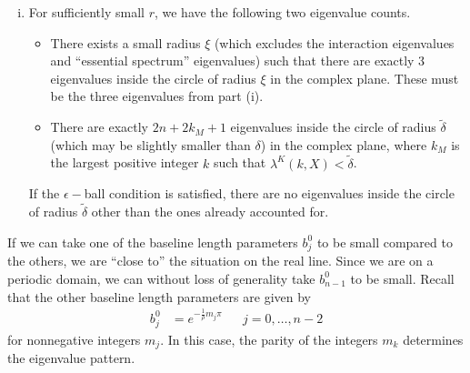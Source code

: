 \documentclass[thesis.tex]{subfiles}
\begin{document}
\begin{theorem}
\begin{enumerate}[(i)]
\item For sufficiently small $r$, we have the following two eigenvalue counts.
\begin{itemize}
	\item There exists a small radius $\xi$ (which excludes the interaction eigenvalues and ``essential spectrum'' eigenvalues) such that there are exactly 3 eigenvalues inside the circle of radius $\xi$ in the complex plane. These must be the three eigenvalues from part (i).

	\item There are exactly $2n + 2 k_M + 1$ eigenvalues inside the circle of radius $\tilde{\delta}$ (which may be slightly smaller than $\delta$) in the complex plane, where $k_M$ is the largest positive integer $k$ such that $\lambda^K(k,X) < \tilde{\delta}$. 
\end{itemize}
If the $\epsilon-$ball condition is satisfied, there are no eigenvalues inside the circle of radius $\tilde{\delta}$ other than the ones already accounted for.
\end{enumerate}
\end{theorem}

If we can take one of the baseline length parameters $b_j^0$ to be small compared to the others, we are ``close to'' the situation on the real line. Since we are on a periodic domain, we can without loss of generality take $b_{n-1}^0$ to be small. Recall that the other baseline length parameters are given by
\begin{align*}
b_j^0 &= e^{-\frac{1}{\rho}m_j \pi} && j = 0, \dots, n-2
\end{align*}
for nonnegative integers $m_j$. In this case, the parity of the  integers $m_k$ determines the eigenvalue pattern.
\end{document}
